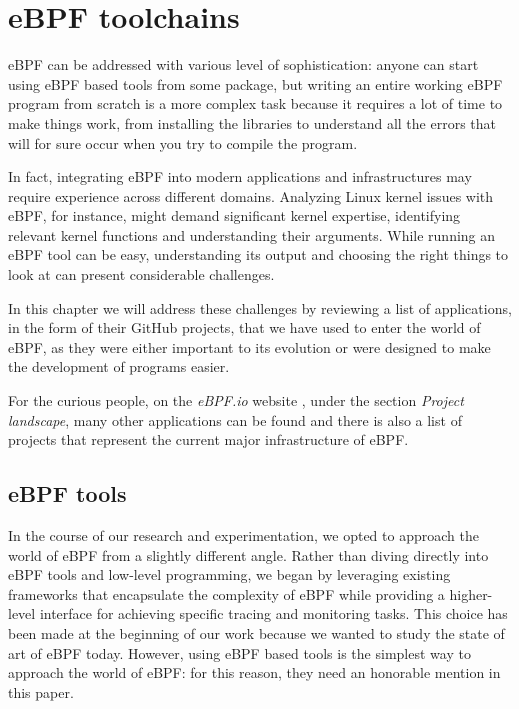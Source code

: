 \chapter{eBPF toolchains}

eBPF can be addressed with various level of sophistication: anyone can start using eBPF based tools from some package, but writing an entire working eBPF program from scratch is a more complex task because it requires a lot of time to make things work, from installing the libraries to understand all the errors that will for sure occur when you try to compile the program.

In fact, integrating eBPF into modern applications and infrastructures may require experience across different domains. 
Analyzing Linux kernel issues with eBPF, for instance, might demand significant kernel expertise, identifying relevant kernel functions and understanding their arguments.
While running an eBPF tool can be easy, understanding its output and choosing the right things to look at can present considerable challenges.

In this chapter we will address these challenges by reviewing a list of applications, in the form of their GitHub projects, that we have used to enter the world of eBPF, as they were either important to its evolution or were designed to make the development of programs easier.

For the curious people, on the \textit{eBPF.io} website \cite{eBPFioWebsite}, under the section \textit{Project landscape}, many other applications can be found and there is also a list of projects that represent the current major infrastructure of eBPF.

\section{eBPF tools}

In the course of our research and experimentation, we opted to approach the world of eBPF from a slightly different angle. 
Rather than diving directly into eBPF tools and low-level programming, we began by leveraging existing frameworks that encapsulate the complexity of eBPF while providing a higher-level interface for achieving specific tracing and monitoring tasks.
This choice has been made at the beginning of our work because we wanted to study the state of art of eBPF today.
However, using eBPF based tools is the simplest way to approach the world of eBPF: for this reason, they need an honorable mention in this paper.

